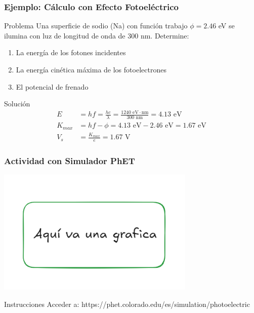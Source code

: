 \documentclass{beamer}
\begin{document}
	\begin{frame}
		\frametitle{Ejemplo: Cálculo con Efecto Fotoeléctrico}
		\small
		\begin{block}{Problema}
			Una superficie de sodio (Na) con función trabajo $\phi = 2.46$ eV se ilumina con luz de longitud de onda de 300 nm. Determine:
			\begin{enumerate}
				\item La energía de los fotones incidentes
				\item La energía cinética máxima de los fotoelectrones
				\item El potencial de frenado
			\end{enumerate}
		\end{block}
		
		\begin{exampleblock}{Solución}
			\begin{align}
				E &= hf = \frac{hc}{\lambda} = \frac{1240 \text{ eV}\cdot\text{nm}}{300 \text{ nm}} = 4.13 \text{ eV}\\
				K_{max} &= hf - \phi = 4.13 \text{ eV} - 2.46 \text{ eV} = 1.67 \text{ eV}\\
				V_s &= \frac{K_{max}}{e} = 1.67 \text{ V}
			\end{align}
		\end{exampleblock}
	\end{frame}
	
	\begin{frame}
		\frametitle{Actividad con Simulador PhET}
		\begin{center}
			\includegraphics[height=6cm]{../Imagenes/grafica_pendiente}
		\end{center}
		\begin{block}{Instrucciones}
			Acceder a: {https://phet.colorado.edu/es/simulation/photoelectric}
		\end{block}
	\end{frame}
	
\end{document}
